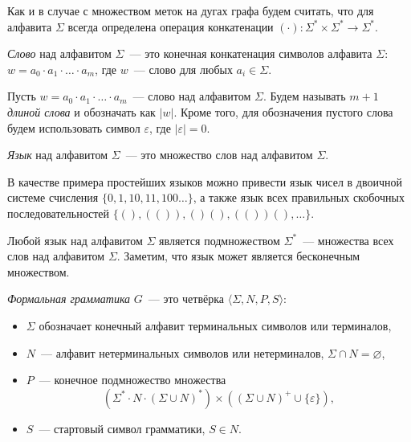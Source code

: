 
Как и в случае с множеством меток на дугах графа будем считать, что для алфавита $\Sigma$ всегда определена операция конкатенации $(\cdot): \Sigma^* \times \Sigma^* \to \Sigma^*$.

\begin{definition}[Слово]
	\textit{Слово} над алфавитом $\Sigma$~--- это конечная конкатенация символов алфавита $\Sigma$: $w = a_0 \cdot a_1 \cdot \ldots \cdot a_m$, где $w$~--- слово для любых $a_i \in \Sigma$.
\end{definition}

\begin{definition}
	Пусть $w = a_0 \cdot a_1 \cdot \ldots \cdot a_m$~--- слово над алфавитом $\Sigma$.
	Будем называть $m + 1$ \textit{длиной слова} и обозначать как $|w|$. Кроме того, для обозначения пустого слова будем использовать символ $\varepsilon$, где $|\varepsilon| = 0$.
\end{definition}

\begin{definition}[Язык]
	\textit{Язык} над алфавитом $\Sigma$~--- это множество слов над алфавитом $\Sigma$.
\end{definition}

В качестве примера простейших языков можно привести  язык чисел в двоичной системе счисления $\{0, 1, 10, 11, 100 \dots\}$, а также язык всех правильных скобочных последовательностей $\{(), (()), ()(), (())(), \dots\}$.
	

Любой язык над алфавитом $\Sigma$ является подмножеством $\Sigma^*$~--- множества всех слов над алфавитом $\Sigma$. Заметим, что язык может является бесконечным множеством.

\begin{definition}
	\textit{Формальная грамматика} $G$~--- это четвёрка $\langle \Sigma, N, P, S \rangle$:  
	\begin{itemize}
		\item $\Sigma$ обозначает конечный алфавит терминальных символов или терминалов, 
		\item $N$~--- алфавит нетерминальных символов или нетерминалов, $\Sigma \cap N=\varnothing$, 
		\item $P$~--- конечное подмножество множества $$( \Sigma^* \cdot N \cdot (\Sigma \cup N)^* ) \times ( (\Sigma \cup N)^+ \cup \{\varepsilon\} ),$$  
		
		\item $S$~--- стартовый символ грамматики, $S  \in N$. 
	\end{itemize}
\end{definition}

